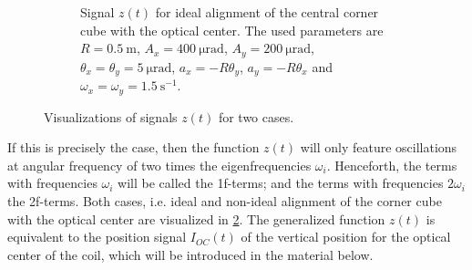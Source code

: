 \documentclass{report}
\numberwithin{tm}{section}
\begin{document}
\begin{figure}[h]
\begin{subfigure}{0.49\textwidth}
		\caption{Signal $z(t)$ for ideal alignment of the central corner cube with the optical center. The used parameters are $R = \SI{0.5}{\meter}$, $A_x = \SI{400}{\micro\radian}$, $A_y = \SI{200}{\micro\radian}$, $\theta_x = \theta_y = \SI{5}{\micro\radian}$, $a_x = -R\theta_y$, $a_y = -R\theta_x$ and $\omega_x = \omega_y = \SI{1.5}{\second^{-1}}$.}
		\label{fig:z(t)_perfect}
	\end{subfigure}
	\caption{Visualizations of signals $z(t)$ for two cases.}
	\label{fig:z(t)}
\end{figure}
If this is precisely the case, then the function $z(t)$ will only feature oscillations at angular frequency of two times the eigenfrequencies $\omega_i$. Henceforth, the terms with frequencies $\omega_i$ will be called the 1f-terms; and the terms with frequencies $2\omega_i$ the 2f-terms. Both cases, i.e. ideal and non-ideal alignment of the corner cube with the optical center are visualized in \cref{fig:z(t)}. The generalized function $z(t)$ is equivalent to the position signal $I_{OC}(t)$ of the vertical position for the optical center of the coil, which will be introduced in the material below.
\end{document}
